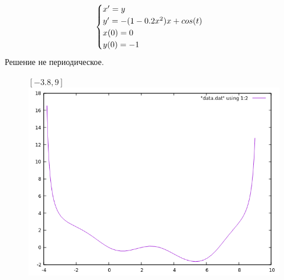 \documentclass[12pt, a4paper] {article}
\theoremstyle{remark}
\theoremstyle{definition}
\begin{document}
\newpage
\begin{gather}
\begin{cases}
\notag x' = y \\
\notag y' = -(1 - 0.2x^2)x + cos(t) \\
\notag x(0) = 0 \\
\notag y(0) = -1
\end{cases}
\end{gather}
Решение не периодическое.
\begin{figure}[h!]
$[-3.8, 9]$ \\
\centering
\includegraphics[width=1\linewidth]{min_0_9.png} 
\end{figure}
\end{document}
